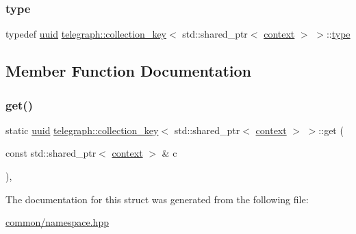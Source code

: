 \subsubsection{\texorpdfstring{type}{type}}
{\footnotesize\ttfamily typedef \hyperlink{namespacetelegraph_a51ee91d7eaeef067f7ccac2b170e5d59}{uuid} \hyperlink{structtelegraph_1_1collection__key}{telegraph\+::collection\+\_\+key}$<$ std\+::shared\+\_\+ptr$<$ \hyperlink{classtelegraph_1_1context}{context} $>$ $>$\+::\hyperlink{structtelegraph_1_1collection__key_3_01std_1_1shared__ptr_3_01context_01_4_01_4_af7ea62096d0cff1cce249a8b4ad37f8b}{type}}



\subsection{Member Function Documentation}
\mbox{\label{structtelegraph_1_1collection__key_3_01std_1_1shared__ptr_3_01context_01_4_01_4_a35cb92d2d9c4516b4a0b9891f177cf05}} 
\subsubsection{\texorpdfstring{get()}{get()}}
{\footnotesize\ttfamily static \hyperlink{namespacetelegraph_a51ee91d7eaeef067f7ccac2b170e5d59}{uuid} \hyperlink{structtelegraph_1_1collection__key}{telegraph\+::collection\+\_\+key}$<$ std\+::shared\+\_\+ptr$<$ \hyperlink{classtelegraph_1_1context}{context} $>$ $>$\+::get (\begin{DoxyParamCaption}\item[{const std\+::shared\+\_\+ptr$<$ \hyperlink{classtelegraph_1_1context}{context} $>$ \&}]{c }\end{DoxyParamCaption})\hspace{0.3cm}{\ttfamily [inline]}, {\ttfamily [static]}}



The documentation for this struct was generated from the following file\+:\begin{DoxyCompactItemize}
\item 
\hyperlink{common_2namespace_8hpp}{common/namespace.\+hpp}\end{DoxyCompactItemize}
